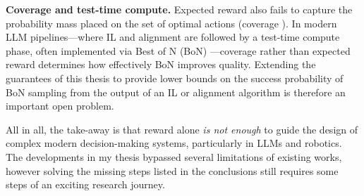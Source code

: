 \documentclass{article}
\begin{document}
\textbf{Coverage and test-time compute.}
Expected reward also fails to capture the probability mass placed on the set of optimal actions (coverage \citep{chen2025coverage,wagenmaker2025posterior}). In modern LLM pipelines---where IL and alignment are followed by a test-time compute phase, often implemented via Best of N (BoN) \citep{gui2024bonbon,huang2025best}---coverage rather than expected reward determines how effectively BoN improves quality. Extending the guarantees of this thesis to provide lower bounds on the success probability of BoN sampling from the output of an IL or alignment algorithm is therefore an important open problem.

All in all, the take-away is that reward alone \emph{is not enough} to guide the design of complex modern decision-making systems, particularly in LLMs and robotics. The developments in my thesis bypassed several limitations of existing works, however solving the missing steps listed in the conclusions still requires some steps of an exciting research journey.

\newpage
%
%



\newpage
\appendix
\end{document}
